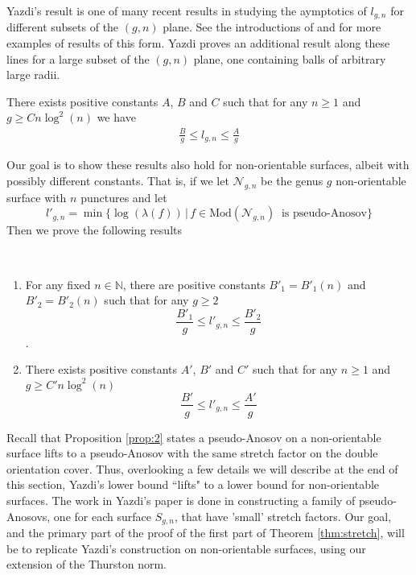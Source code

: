 Yazdi's result is one of many recent results in studying the aymptotics of $l_{g,n}$ for different subsets of the $(g,n)$ plane. See the introductions of \cite{yazdi2018pseudo} and \cite{tsai2009asymptotic} for more examples of results of this form. Yazdi proves an additional result along these lines for a large subset of the $(g,n)$ plane, one containing balls of arbitrary large radii.

\begin{thm}[Yazdi]
    \label{thm:yazdi2}
    There exists positive constants $A$, $B$ and $C$ such that for any $n \geq 1$ and $g \geq Cn\log^2(n)$ we have
    \begin{align*}
        \frac{B}{g} \leq l_{g,n} \leq \frac{A}{g}
    \end{align*}

\end{thm}

Our goal is to show these results also hold for non-orientable surfaces, albeit with possibly different constants. That is, if we let $\mathcal{N}_{g,n}$ be the genus $g$ non-orientable surface with $n$ punctures and let
$$l'_{g,n} = \min\{\log(\lambda(f)) \, \vert \, f \in \text{Mod}(\mathcal{N}_{g,n})\ \text{ is pseudo-Anosov}\}$$
Then we prove the following results
\begin{thm}
\label{thm:stretch}
~\begin{enumerate}
    \item For any fixed $n \in \mathbb{N}$, there are positive constants $B'_1 = B'_1(n)$ and $B'_2 = B'_2(n)$ such that for any $g \geq 2$ $$\frac{B'_1}{g} \leq l'_{g,n} \leq \frac{B'_2}{g}$$.
    \item There exists positive constants $A'$, $B'$ and $C'$ such that for any $n \geq 1$ and $g \geq C'n\log^2(n)$ $$\frac{B'}{g} \leq l'_{g,n} \leq \frac{A'}{g}$$
\end{enumerate}
\end{thm}

Recall that Proposition \ref{prop:2} states a pseudo-Anosov on a non-orientable surface lifts to a pseudo-Anosov with the same stretch factor on the double orientation cover. Thus, overlooking a few details we will describe at the end of this section, Yazdi's lower bound ``lifts" to a lower bound for non-orientable surfaces. The work in Yazdi's paper is done in constructing a family of pseudo-Anosovs, one for each surface $S_{g,n}$, that have 'small' stretch factors. Our goal, and the primary part of the proof of the first part of Theorem \ref{thm:stretch}, will be to replicate Yazdi's construction on non-orientable surfaces, using our extension of the Thurston norm.

